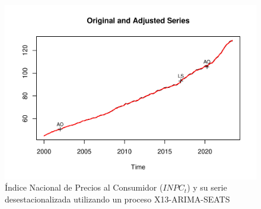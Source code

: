 \documentclass[
]{book}
\begin{document}
\begin{figure}

{\centering \includegraphics[width=0.95\linewidth]{Notas-Series-Tiempo_files/figure-latex/fig51-1} 

}

\caption{Índice Nacional de Precios al Consumidor ($INPC_t$) y su serie desestacionalizada utilizando un proceso X13-ARIMA-SEATS}\label{fig:fig51}
\end{figure}
\end{document}
